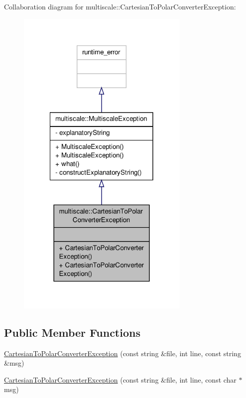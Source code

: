 Collaboration diagram for multiscale\-:\-:Cartesian\-To\-Polar\-Converter\-Exception\-:\nopagebreak
\begin{figure}[H]
\begin{center}
\leavevmode
\includegraphics[width=234pt]{classmultiscale_1_1CartesianToPolarConverterException__coll__graph}
\end{center}
\end{figure}
\subsection*{Public Member Functions}
\begin{DoxyCompactItemize}
\item 
\hyperlink{classmultiscale_1_1CartesianToPolarConverterException_a70f2259e58ab16d64d88e8728fd67f26}{Cartesian\-To\-Polar\-Converter\-Exception} (const string \&file, int line, const string \&msg)
\item 
\hyperlink{classmultiscale_1_1CartesianToPolarConverterException_a9d77f79a95ff2557a6cd5060021c70c2}{Cartesian\-To\-Polar\-Converter\-Exception} (const string \&file, int line, const char $\ast$msg)
\end{DoxyCompactItemize}


